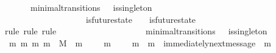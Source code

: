 \begin{isabellebody}
\ {\isachardoublequoteopen}{\isasymforall}\ {\isasymsigma}\ {\isasymsigma}{\isacharprime}{\isachardot}\ {\isacharparenleft}{\isasymsigma}{\isacharcomma}\ {\isasymsigma}{\isacharprime}{\isacharparenright}\ {\isasymin}\ minimal{\isacharunderscore}transitions\ {\isasymand}\ {\isasymnot}\ is{\isacharunderscore}singleton\ {\isacharparenleft}{\isasymsigma}{\isacharprime}{\isacharminus}\ {\isasymsigma}{\isacharparenright}\ {\isasymlongrightarrow}\isanewline
\ \ \ \ \ \ \ \ \ \ \ \ \ \ {\isacharparenleft}{\isasymexists}\ {\isasymsigma}{\isacharprime}{\isacharprime}{\isachardot}\ {\isasymsigma}{\isacharprime}{\isacharprime}\ {\isasymin}\ {\isasymSigma}\ {\isasymand}\ is{\isacharunderscore}future{\isacharunderscore}state\ {\isacharparenleft}{\isasymsigma}{\isacharcomma}\ {\isasymsigma}{\isacharprime}{\isacharprime}{\isacharparenright}\ {\isasymand}\ is{\isacharunderscore}future{\isacharunderscore}state\ {\isacharparenleft}{\isasymsigma}{\isacharprime}{\isacharprime}{\isacharcomma}\ {\isasymsigma}{\isacharprime}{\isacharparenright}\ {\isasymand}\ {\isasymsigma}\ {\isasymnoteq}\ {\isasymsigma}{\isacharprime}{\isacharprime}\ {\isasymand}\ {\isasymsigma}{\isacharprime}{\isacharprime}\ {\isasymnoteq}\ {\isasymsigma}{\isacharprime}{\isacharparenright}{\isachardoublequoteclose}\isanewline
\ \ \ \ \isamarkupfalse%
\ {\isacharparenleft}rule{\isacharcomma}\ rule{\isacharcomma}\ rule{\isacharparenright}\isanewline
\ \ \isamarkupfalse%
\ {\isacharminus}\isanewline
\ \ \ \ \isamarkupfalse%
\ {\isasymsigma}\ {\isasymsigma}{\isacharprime}\isanewline
\ \ \ \ \isamarkupfalse%
\ {\isachardoublequoteopen}{\isacharparenleft}{\isasymsigma}{\isacharcomma}\ {\isasymsigma}{\isacharprime}{\isacharparenright}\ {\isasymin}\ minimal{\isacharunderscore}transitions\ {\isasymand}\ {\isasymnot}\ is{\isacharunderscore}singleton\ {\isacharparenleft}{\isasymsigma}{\isacharprime}\ {\isacharminus}\ {\isasymsigma}{\isacharparenright}{\isachardoublequoteclose}\isanewline
\ \ \ \ \isamarkupfalse%
\ \isamarkupfalse%
\ {\isachardoublequoteopen}{\isasymexists}\ m{}\ m{}{\isachardot}\ {\isacharbraceleft}m{}{\isacharcomma}\ m{}{\isacharbraceright}\ {\isasymsubseteq}\ M\ {\isasymand}\ m{}\ {\isasymin}\ {\isasymsigma}{\isacharprime}{\isacharminus}\ {\isasymsigma}\ {\isasymand}\ m{}\ {\isasymin}\ {\isasymsigma}{\isacharprime}{\isacharminus}\ {\isasymsigma}\ {\isasymand}\ m{}\ {\isasymnoteq}\ m{}\ {\isasymand}\ immediately{\isacharunderscore}next{\isacharunderscore}message\ {\isacharparenleft}{\isasymsigma}{\isacharcomma}\ m{}{\isacharparenright}{\isachardoublequoteclose}\isanewline

\end{isabellebody}
